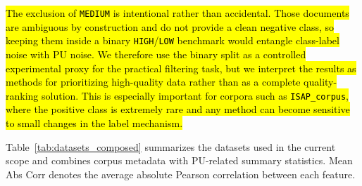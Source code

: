 \documentclass[applsci,article,submit,pdftex,moreauthors]{Definitions/mdpi}
\newcommand{\rev}[1]{\hl{#1}}
\begin{document}
\rev{The exclusion of \texttt{MEDIUM} is intentional rather than accidental. Those documents are ambiguous by construction and do not provide a clean negative class, so keeping them inside a binary \texttt{HIGH}/\texttt{LOW} benchmark would entangle class-label noise with PU noise. We therefore use the binary split as a controlled experimental proxy for the practical filtering task, but we interpret the results as methods for prioritizing high-quality data rather than as a complete quality-ranking solution. This is especially important for corpora such as \texttt{ISAP\_corpus}, where the positive class is extremely rare and any method can become sensitive to small changes in the label mechanism.}

Table~\ref{tab:datasets_composed} summarizes the datasets used in the current scope and combines corpus metadata with PU-related summary statistics. Mean Abs Corr denotes the average absolute Pearson correlation between each feature.

\begin{table}[htbp]
\caption{SpeakLeash datasets used in the latest benchmark run, with corpus metadata and PU summary statistics.}\label{tab:datasets_composed}
\centering
\small
{}
\end{table}
\end{document}
